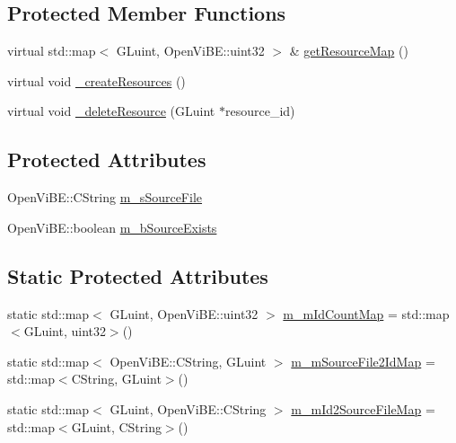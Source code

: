 \subsection*{Protected Member Functions}
\begin{DoxyCompactItemize}
\item 
virtual std::map$<$ GLuint, OpenViBE::uint32 $>$ \& \hyperlink{classOpenViBEApplications_1_1OpenGLTextureManager_a7a13328ef662012d89d75e28b93b48d2}{getResourceMap} ()
\item 
virtual void \hyperlink{classOpenViBEApplications_1_1OpenGLTextureManager_a67036e2e5149f866e3b9aa9a1b6cd1a2}{\_\-createResources} ()
\item 
virtual void \hyperlink{classOpenViBEApplications_1_1OpenGLTextureManager_a1c93c2cbb8340823cc2299e2b01bfff5}{\_\-deleteResource} (GLuint $\ast$resource\_\-id)
\end{DoxyCompactItemize}
\subsection*{Protected Attributes}
\begin{DoxyCompactItemize}
\item 
OpenViBE::CString \hyperlink{classOpenViBEApplications_1_1OpenGLTextureManager_a461423473ce47d21df7dea4765b3f51b}{m\_\-sSourceFile}
\item 
OpenViBE::boolean \hyperlink{classOpenViBEApplications_1_1OpenGLTextureManager_a7724d7b37ba2abfe1f83f47dfb428c31}{m\_\-bSourceExists}
\end{DoxyCompactItemize}
\subsection*{Static Protected Attributes}
\begin{DoxyCompactItemize}
\item 
static std::map$<$ GLuint, OpenViBE::uint32 $>$ \hyperlink{classOpenViBEApplications_1_1OpenGLTextureManager_abd308f1802ef4570dc6fce3f6b7ce35c}{m\_\-mIdCountMap} = std::map$<$GLuint, uint32$>$()
\item 
static std::map$<$ OpenViBE::CString, GLuint $>$ \hyperlink{classOpenViBEApplications_1_1OpenGLTextureManager_a0e7b52d70304021a44d2f2a5cd9c502c}{m\_\-mSourceFile2IdMap} = std::map$<$CString, GLuint$>$()
\item 
static std::map$<$ GLuint, OpenViBE::CString $>$ \hyperlink{classOpenViBEApplications_1_1OpenGLTextureManager_af694696e563fa4e71386217ddb15b061}{m\_\-mId2SourceFileMap} = std::map$<$GLuint, CString$>$()
\end{DoxyCompactItemize}


